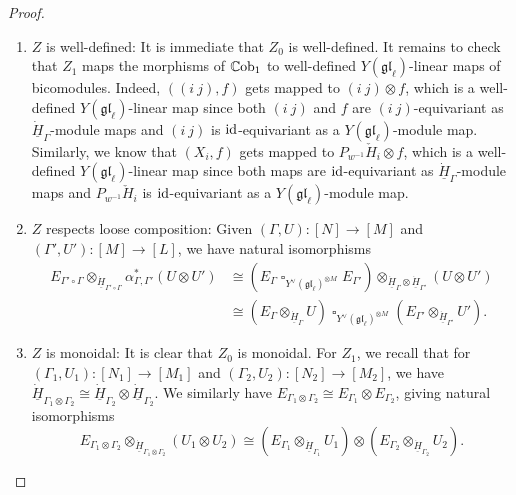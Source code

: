 \documentclass[11pt]{report}
\theoremstyle{definition}
\theoremstyle{remark}
\theoremstyle{remark}
\newcommand{\id}{\textnormal{id}}
\begin{document}
\begin{proof}
\begin{enumerate}[label=(\roman*)]
\item $Z$ is well-defined: It is immediate that $Z_0$ is well-defined. It remains to check that $Z_1$ maps the morphisms of $\mathbb{C}\textnormal{ob}_1$ to well-defined $Y(\mathfrak{gl}_\ell)$-linear maps of bicomodules. Indeed, $((i \ j),f)$ gets mapped to $(i \ j) \otimes f$, which is a well-defined $Y(\mathfrak{gl}_\ell)$-linear map since both $(i \ j)$ and $f$ are $(i \ j)$-equivariant as $\underline{\dot H}_\Gamma$-module maps and $(i \ j)$ is $\id$-equivariant as a $Y(\mathfrak{gl}_\ell)$-module map. Similarly, we know that $(X_i,f)$ gets mapped to $P_{w^{-1}} \check H_i \otimes f$, which is a well-defined $Y(\mathfrak{gl}_\ell)$-linear map since both maps are $\id$-equivariant as $\underline{\dot H}_\Gamma$-module maps and $P_{w^{-1}} \check H_i$ is $\id$-equivariant as a $Y(\mathfrak{gl}_\ell)$-module map.
\item $Z$ respects loose composition: Given $(\Gamma,U): [N] \to [M]$ and $(\Gamma',U'): [M] \to [L]$, we have natural isomorphisms
\begin{align*}
E_{\Gamma' \circ \Gamma} \otimes_{\underline{\dot H}_{\Gamma' \circ \Gamma}} \alpha_{\Gamma,\Gamma'}^*(U \otimes U')
&\cong (E_\Gamma \operatorname{\square}_{Y^\vee(\mathfrak{gl}_\ell)^{\otimes M}} E_{\Gamma'}) \otimes_{\underline{\dot H}_\Gamma \otimes \underline{\dot H}_{\Gamma'}} (U \otimes U') \\
&\cong (E_\Gamma \otimes_{\underline{\dot H}_\Gamma} U) \operatorname{\square}_{Y^\vee(\mathfrak{gl}_\ell)^{\otimes M}} (E_{\Gamma'} \otimes_{\underline{\dot H}_{\Gamma'}} U').
\end{align*}
\item $Z$ is monoidal: It is clear that $Z_0$ is monoidal. For $Z_1$, we recall that for $(\Gamma_1,U_1): [N_1] \to [M_1]$ and $(\Gamma_2,U_2):[N_2] \to [M_2]$, we have $\underline{\dot H}_{\Gamma_1 \otimes \Gamma_2} \cong \underline{\dot H}_{\Gamma_2} \otimes \underline{\dot H}_{\Gamma_2}$. We similarly have $E_{\Gamma_1 \otimes \Gamma_2} \cong E_{\Gamma_1} \otimes E_{\Gamma_2}$, giving natural isomorphisms
\begin{equation*}
E_{\Gamma_1 \otimes \Gamma_2} \otimes_{\underline{\dot H}_{\Gamma_1 \otimes \Gamma_2}} (U_1 \otimes U_2) \cong (E_{\Gamma_1} \otimes_{\underline{\dot H}_{\Gamma_1}} U_1) \otimes (E_{\Gamma_2} \otimes_{\underline{\dot H}_{\Gamma_2}} U_2).
\end{equation*}
\end{enumerate}
\end{proof}
\end{document}
